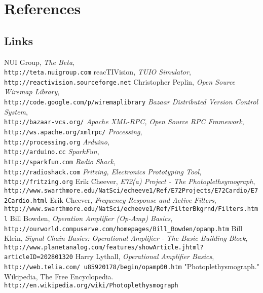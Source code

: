 \chapter{References}

\section{Links}
\begin{thebibliography}{9999}%
NUI Group, \textsl{The Beta},
\\ \mbox{}\hfill\texttt{http://teta.nuigroup.com}
reacTIVision, \textsl{TUIO Simulator},
\\ \mbox{}\hfill\texttt{http://reactivision.sourceforge.net}
Christopher Peplin, \textsl{Open Source Wiremap Library},
\\ \mbox{}\hfill\texttt{http://code.google.com/p/wiremaplibrary}
\textsl{Bazaar Distributed Version Control System},
\\ \mbox{}\hfill\texttt{http://bazaar-vcs.org/}
\textsl{Apache XML-RPC, Open Source RPC Framework},
\\ \mbox{}\hfill\texttt{http://ws.apache.org/xmlrpc/}
\textsl{Processing}, 
\\ \mbox{}\hfill\texttt{http://processing.org}
\textsl{Arduino},
\\ \mbox{}\hfill\texttt{http://arduino.cc}
\textsl{SparkFun},
\\ \mbox{}\hfill\texttt{http://sparkfun.com}
\textsl{Radio Shack},
\\ \mbox{}\hfill\texttt{http://radioshack.com}
\textsl{Fritzing, Electronics Prototyping Tool},
\\ \mbox{}\hfill\texttt{http://fritzing.org}
Erik Cheever, \textsl{E72(a) Project - The Photoplethsymograph},
\\ \mbox{}\hfill\texttt{http://www.swarthmore.edu/NatSci/echeeve1/Ref/E72Projects/E72Cardio/E72Cardio.html}
Erik Cheever, \textsl{Frequency Response and Active Filters},
\\ \mbox{}\hfill\texttt{http://www.swarthmore.edu/NatSci/echeeve1/Ref/FilterBkgrnd/Filters.html}
Bill Bowden, \textsl{Operation Amplifier (Op-Amp) Basics},
\\ \mbox{}\hfill\texttt{http://ourworld.compuserve.com/homepages/Bill\_Bowden/opamp.htm}
Bill Klein, \textsl{Signal Chain Basics: Operational Amplifier - The Basic Building Block},
\\ \mbox{}\hfill\texttt{http://www.planetanalog.com/features/showArticle.jhtml?articleID=202801320}
Harry Lythall, \textsl{Operational Amplifier Basics},
\\ \mbox{}\hfill\texttt{http://web.telia.com/~u85920178/begin/opamp00.htm}
"Photoplethysmograph." Wikipedia, The Free Encyclopedia.
\\ \mbox{}\hfill\texttt{http://en.wikipedia.org/wiki/Photoplethysmograph}
\end{thebibliography}
